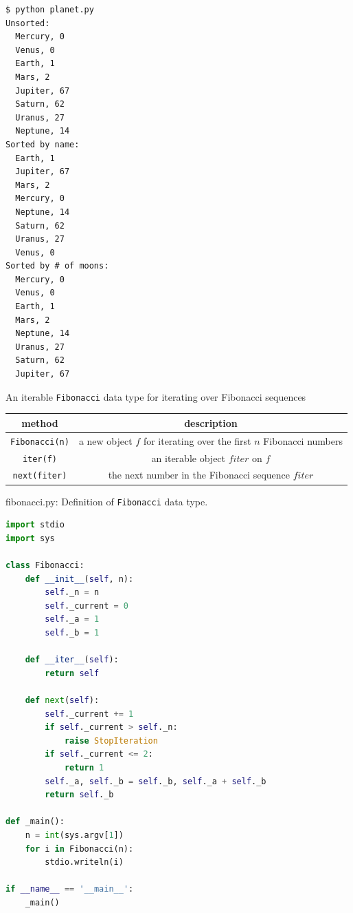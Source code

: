\documentclass[8pt,a4paper,compress]{beamer}
\begin{document}
\begin{frame}[fragile]
\pause

\begin{lstlisting}[language={}]
$ python planet.py 
Unsorted:
  Mercury, 0
  Venus, 0
  Earth, 1
  Mars, 2
  Jupiter, 67
  Saturn, 62
  Uranus, 27
  Neptune, 14
Sorted by name:
  Earth, 1
  Jupiter, 67
  Mars, 2
  Mercury, 0
  Neptune, 14
  Saturn, 62
  Uranus, 27
  Venus, 0
Sorted by # of moons:
  Mercury, 0
  Venus, 0
  Earth, 1
  Mars, 2
  Neptune, 14
  Uranus, 27
  Saturn, 62
  Jupiter, 67
\end{lstlisting}
\end{frame}

\begin{frame}[fragile]
\pause

An iterable \lstinline{Fibonacci} data type for iterating over Fibonacci sequences
\begin{center}
\begin{tabular}{cc}
method & description \\ \hline
\lstinline$Fibonacci(n)$ & a new object $f$ for iterating over the first $n$ Fibonacci numbers \\
\lstinline$iter(f)$ & an iterable object $fiter$ on $f$ \\
\lstinline$next(fiter)$ & the next number in the Fibonacci sequence $fiter$
\end{tabular} 
\end{center}
\end{frame}

\begin{frame}[fragile]
\pause

\begin{framed}
\tiny fibonacci.py: Definition of \lstinline{Fibonacci} data type.
\end{framed}

\begin{lstlisting}[language=Python]
import stdio
import sys

class Fibonacci:
    def __init__(self, n):
        self._n = n
        self._current = 0
        self._a = 1
        self._b = 1

    def __iter__(self):
        return self
        
    def next(self):
        self._current += 1
        if self._current > self._n:
            raise StopIteration
        if self._current <= 2:
            return 1
        self._a, self._b = self._b, self._a + self._b
        return self._b

def _main():
    n = int(sys.argv[1])
    for i in Fibonacci(n):
        stdio.writeln(i)

if __name__ == '__main__':
    _main()
\end{lstlisting}
\end{frame}
\end{document}
